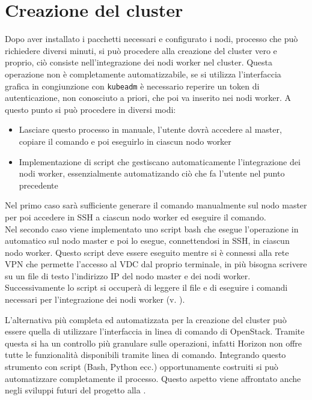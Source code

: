 \documentclass[12pt,a4paper,openright,twoside]{book}
\begin{document}
\section{Creazione del cluster}
\label{sec:cluster-creation}
Dopo aver installato i pacchetti necessari e configurato i nodi, processo che può richiedere diversi minuti, si può procedere alla creazione del cluster vero e proprio,
ciò consiste nell'integrazione dei nodi worker nel cluster. Questa operazione non è completamente automatizzabile, se si utilizza
l'interfaccia grafica in congiunzione con \texttt{kubeadm} è necessario reperire un token di autenticazione, non conosciuto a priori, che poi va inserito nei nodi worker.
A questo punto si può procedere in diversi modi:
\begin{itemize}
    \item Lasciare questo processo in manuale, l'utente dovrà accedere al master, copiare il comando e poi eseguirlo in ciascun nodo worker
    \item Implementazione di script che gestiscano automaticamente l'integrazione dei nodi worker, essenzialmente automatizando ciò che fa l'utente nel punto precedente
\end{itemize}
Nel primo caso sarà sufficiente generare il comando manualmente sul nodo master per poi accedere in SSH a ciascun nodo worker ed eseguire il comando.\\
Nel secondo caso viene implementato uno script bash che esegue l'operazione in automatico sul nodo master e poi lo esegue, connettendosi in SSH, in ciascun nodo worker. 
Questo script deve essere eseguito mentre si è connessi alla rete VPN che permette l'accesso al VDC dal proprio terminale, in più bisogna scrivere su un file di testo l'indirizzo IP del nodo master e dei nodi worker.
Successivamente lo script si occuperà di leggere il file e di eseguire i comandi necessari per l'integrazione dei nodi worker (v. ).


L'alternativa più completa ed automatizzata per la creazione del cluster può essere quella di utilizzare l'interfaccia in linea di comando di OpenStack.
Tramite questa si ha un controllo più granulare sulle operazioni, infatti Horizon non offre tutte le funzionalità disponibili tramite linea di comando.
Integrando questo strumento con script (Bash, Python ecc.) opportunamente costruiti si può automatizzare completamente il processo.
Questo aspetto viene affrontato anche negli sviluppi futuri del progetto alla .
\end{document}
